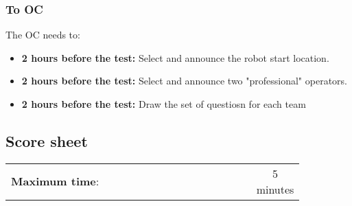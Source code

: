 \subsubsection*{To OC}
The OC needs to:
\begin{itemize}
	\item \textbf{2 hours before the test:} Select and announce the robot start location.
	\item \textbf{2 hours before the test:} Select and announce two "professional" operators.
	\item \textbf{2 hours before the test:} Draw the set of questiosn for each team
\end{itemize}

\newpage
\subsection*{Score sheet}

\begin{table}[h]
	\begin{tabular}{m{0.85\linewidth} c}
		\textbf{Maximum time}: & 5 minutes \\
	\end{tabular}
\end{table}

\begin{scorelist}



\end{scorelist}

\clearpage

